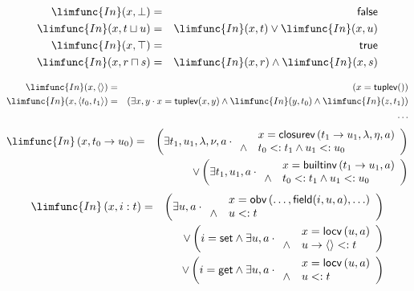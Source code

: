 \documentclass[12pt]{article}
\begin{document}
\begin{eqnarray*}
\limfunc{In}(x,\bot ) &=&\mathsf{false} \\
\limfunc{In}(x,t\sqcup u) &=&\limfunc{In}(x,t)\vee \limfunc{In}(x,u) \\
\limfunc{In}(x,\top ) &=&\mathsf{true} \\
\limfunc{In}(x,r\sqcap s) &=&\limfunc{In}(x,r)\wedge \limfunc{In}(x,s)
\end{eqnarray*}

\begin{eqnarray*}
\limfunc{In}(x,\left\langle {}\right\rangle ) &=&\left( x=\mathsf{tuplev}%
()\right)  \\
\limfunc{In}(x,\left\langle t_{0},t_{1}\right\rangle ) &=&\left( \exists
x,y\cdot x=\mathsf{tuplev}(x,y)\wedge \limfunc{In}(y,t_{0})\wedge \limfunc{In%
}(z,t_{1})\right)  \\
&&\ldots 
\end{eqnarray*}%
\begin{eqnarray*}
\limfunc{In}\left( x,t_{0}\rightarrow u_{0}\right)  &=&\left( \exists
t_{1},u_{1},\lambda ,\nu ,a\cdot 
\begin{array}{ll}
& x=\mathsf{closurev}\left( t_{1}\rightarrow u_{1},\lambda ,\eta ,a\right) 
\\ 
\wedge  & t_{0}<:t_{1}\wedge u_{1}<:u_{0}%
\end{array}%
\right)  \\
&&\vee \left( \exists t_{1},u_{1},a\cdot 
\begin{array}{ll}
& x=\mathsf{builtinv}\left( t_{1}\rightarrow u_{1},a\right)  \\ 
\wedge  & t_{0}<:t_{1}\wedge u_{1}<:u_{0}%
\end{array}%
\right) 
\end{eqnarray*}%
\begin{eqnarray*}
\limfunc{In}\left( x,i:t\right)  &=&\left( \exists u,a\cdot 
\begin{array}{ll}
& x=\mathsf{obv}\left( \ldots ,\mathsf{field}(i,u,a),\ldots \right)  \\ 
\wedge  & u<:t%
\end{array}%
\right)  \\
&&\vee \left( i=\mathsf{set}\wedge \exists u,a\cdot 
\begin{array}{ll}
& x=\mathsf{locv}\left( u,a\right)  \\ 
\wedge  & u\rightarrow \left\langle {}\right\rangle <:t%
\end{array}%
\right)  \\
&&\vee \left( i=\mathsf{get}\wedge \exists u,a\cdot 
\begin{array}{ll}
& x=\mathsf{locv}\left( u,a\right)  \\ 
\wedge  & u<:t%
\end{array}%
\right) 
\end{eqnarray*}%
\end{document}
